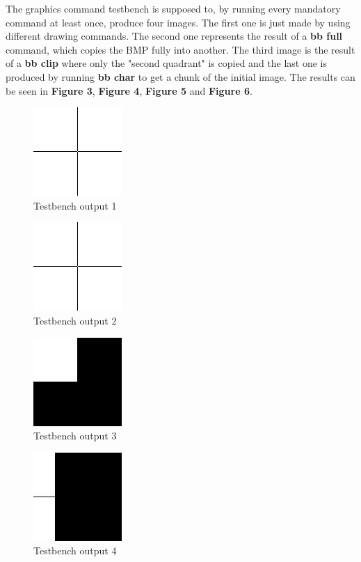 \documentclass[10pt,a4paper,titlepage,oneside]{article}
\begin{document}
\begin{qa}{The graphics command testbench is supposed to, by running every mandatory command at least once, produce four images. The first one is just made by using different drawing commands.
The second one represents the result of a \textbf{bb full} command, which copies the BMP fully into another. The third image is the result of a \textbf{bb clip} where only the "second quadrant" is copied and the
last one is produced by running \textbf{bb char} to get a chunk of the initial image. The results can be seen in \textbf{Figure 3}, \textbf{Figure 4}, \textbf{Figure 5} and \textbf{Figure 6}.}


\begin{figure}[h!]
	\centering
	\includegraphics[width=0.25\linewidth]{0.jpg}
	\caption{Testbench output 1}
\end{figure}

\begin{figure}[h!]
	\centering
	\includegraphics[width=0.25\linewidth]{1.jpg}
	\caption{Testbench output 2}
\end{figure}

\begin{figure}[h!]
	\centering
	\includegraphics[width=0.25\linewidth]{2.jpg}
	\caption{Testbench output 3}
\end{figure}

\begin{figure}[h!]
	\centering
	\includegraphics[width=0.25\linewidth]{3.jpg}
	\caption{Testbench output 4}
\end{figure}

\end{qa}
\end{document}
